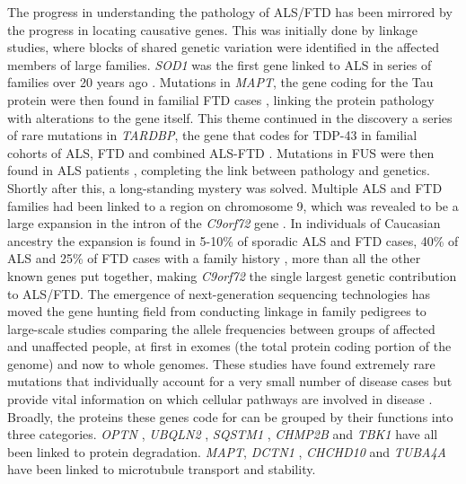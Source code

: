 The progress in understanding the pathology of ALS/FTD has been mirrored by the progress in locating causative genes. 
This was initially done by linkage studies, where blocks of shared genetic variation were identified in the affected members of large families. 
\textit{SOD1} was the first gene linked to ALS in series of families over 20 years ago \citep{Rosen1993}. 
Mutations in \textit{MAPT}, the gene coding for the Tau protein were then found in familial FTD cases \citep{Hutton1998}, linking the protein pathology with alterations to the gene itself. 
This theme continued in the discovery a series of rare mutations in \textit{TARDBP}, the gene that codes for TDP-43 in familial cohorts of ALS, FTD and combined ALS-FTD \citep{Sreedharan2008-xv, Kabashi2008, Benajiba2009,Borroni2009}. 
Mutations in FUS were then found in ALS patients \citep{Vance2009-ye, Kwiatkowski2009}, completing the link between pathology and genetics.
Shortly after this, a long-standing mystery was solved.
Multiple ALS and FTD families had been linked to a region on chromosome 9, which was revealed to be a large expansion in the intron of the \textit{C9orf72} gene \citep{Renton2011,DeJesus-Hernandez2011}. 
In individuals of Caucasian ancestry the expansion is found in 5-10\% of sporadic ALS and FTD cases, 40\% of ALS and 25\% of FTD cases with a family history \citep{Majounie2012}, more than all the other known genes put together, making \textit{C9orf72} the single largest genetic contribution to ALS/FTD. 
The emergence of next-generation sequencing technologies has moved the gene hunting field from conducting linkage in family pedigrees to large-scale studies comparing the allele frequencies between groups of affected and unaffected people, at first in exomes (the total protein coding portion of the genome) and now to whole genomes. 
These studies have found extremely rare mutations that individually account for a very small number of disease cases but provide vital information on which cellular pathways are involved in disease  \citep{Taylor2016,Pottier2016}.
Broadly, the proteins these genes code for can be grouped by their functions into three categories. 
\textit{OPTN} \citep{Maruyama2010} , \textit{UBQLN2} \citep{Deng2011}, \textit{SQSTM1} \citep{Fecto2011}, \textit{CHMP2B} \citep{Skibinski2005} and \textit{TBK1} \citep{Cirulli2015,Freischmidt2015} have all been linked to protein degradation. 
\textit{MAPT}, \textit{DCTN1} \citep{Puls2003} , \textit{CHCHD10} \citep{Bannwarth2014} and \textit{TUBA4A} \citep{Smith2014} have been linked to microtubule transport and stability. 
